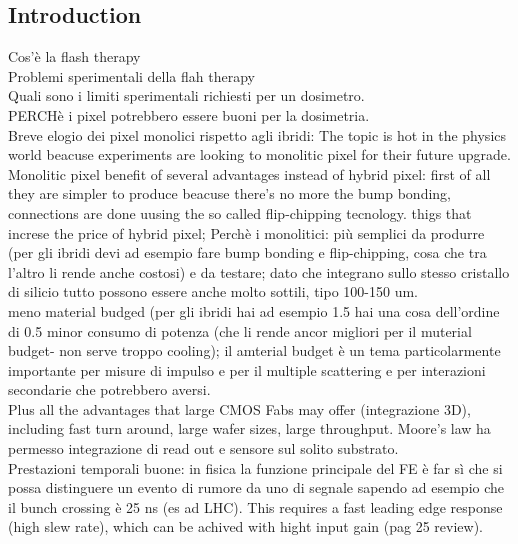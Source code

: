 \begin{titlepage}

\section{Introduction}

Cos'è la flash therapy\\
Problemi sperimentali della flah therapy\\
Quali sono i limiti sperimentali richiesti per un dosimetro.\\
PERCHè i pixel potrebbero essere buoni per la dosimetria.\\

Breve elogio dei pixel monolici rispetto agli ibridi:
The topic is hot in the physics world beacuse experiments are looking to monolitic
pixel for their future upgrade. \\
Monolitic pixel benefit of several advantages instead of hybrid pixel: first of all
they are simpler to produce beacuse there's no more the bump bonding, connections are done uusing the so called
flip-chipping tecnology.
thigs that increse the price of hybrid pixel;
Perchè i monolitici: più semplici da produrre (per gli ibridi devi ad esempio fare
bump bonding e flip-chipping, cosa che tra l'altro li rende anche costosi) e da testare;
dato che integrano sullo stesso cristallo di silicio tutto possono essere anche molto
sottili, tipo 100-150 um.\\
meno material budged (per gli ibridi hai ad esempio 1.5 %
hai una cosa dell'ordine di 0.5 %
minor consumo di potenza (che li rende ancor migliori per il muterial budget-
non serve troppo cooling); il amterial budget è un tema particolarmente importante
per misure di impulso e per il multiple scattering e per interazioni secondarie che
potrebbero aversi.\\

 Plus all the advantages that large CMOS Fabs may offer
 (integrazione 3D), including fast turn around, large wafer sizes, large throughput.
Moore's law ha permesso integrazione di read out e sensore sul solito substrato.\\
Prestazioni temporali buone: in fisica la funzione principale del FE è far sì
che si possa distinguere un evento di rumore da uno di segnale sapendo ad esempio che
il bunch crossing è 25 ns (es ad LHC).
This requires a fast leading edge response (high slew rate),
which can be achived with hight input gain (pag 25 review).


\end{titlepage}

